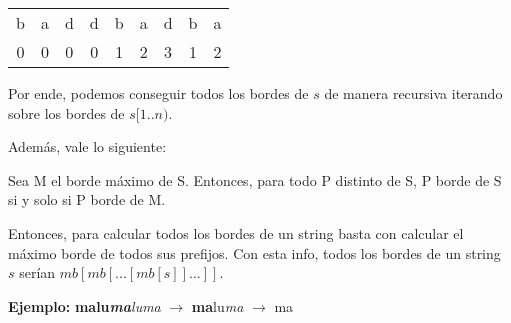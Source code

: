 \begin{tabular}{ccccccccc}
    b & a & d & d & b & a & d & b & a \\
    0 & 0 & 0 & 0 & 1 & 2 & 3 & 1 & 2
\end{tabular}
 
Por ende, podemos conseguir todos los bordes de $s$ de manera recursiva iterando sobre los bordes de $s[1..n)$.

Además, vale lo siguiente:

\begin{lema}
    Sea M el borde máximo de S. Entonces, para todo P distinto de S, P borde de S si y solo si P borde de M.
\end{lema}

Entonces, para calcular todos los bordes de un string basta con calcular el máximo borde de todos sus prefijos. Con esta info, todos los bordes de un string $s$ serían $mb[mb[...[mb[s]]...]]$.

\textbf{Ejemplo:} \textbf{malu\textit{ma}}\textit{luma} $\to$ \textbf{ma}lu\textit{ma} $\to$ ma
